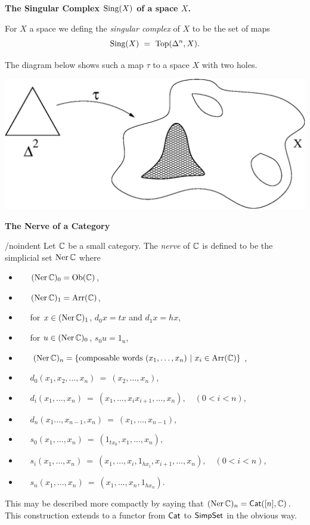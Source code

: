 \newpage\noindent
{\bf The Singular Complex $\mathrm{Sing}(X)$ of a space $X$.}

\medskip
For $X$ a space we defing the \emph{singular complex} of $X$ to be 
the set of maps 
$$
\mathrm{Sing}(X) ~=~ \mathrm{Top}(\Delta^n,X). 
$$

The diagram below shows such a map $\tau$ to a space $X$ with two holes.
\begin{center}
\includegraphics[scale = 0.7]{simp-gps/delta2X.eps}
\end{center}


\bigskip\noindent
{\bf The Nerve of a Category} 

\medskip/noindent
Let $\mathbb{C}$ be a small category. 
The \emph{nerve} of $\mathbb{C}$ is defined to be the simplicial set $\mathrm{Ner}\,\mathbb{C}$ 
where 
\begin{itemize}
\item~~
$(\mathrm{Ner}\,\mathbb{C})_0 = \mathrm{Ob}(\mathbb{C})$, 
\item~~
$(\mathrm{Ner}\,\mathbb{C})_1 = \mathrm{Arr}(\mathbb{C})$, 
\item~~
for $x \in (\mathrm{Ner}\,\mathbb{C})_1$, $d_0 x = tx$ and $d_1x = hx$, 
\item~~
for $u \in (\mathrm{Ner}\,\mathbb{C})_0$, $s_0u = 1_u$, 
\item~~
$(\mathrm{Ner}\,\mathbb{C})_n = \{ \text{composable words}~ (x_1,\ldots,x_n) ~|~  
                    x_i \in \mathrm{Arr}(\mathbb{C}) \}$, 
\item~~
$d_0(x_1,x_2,\ldots,x_n) ~=~ (x_2,\ldots,x_n)$, 
\item~~
$d_i(x_1,\ldots,x_n) ~=~ (x_1,\ldots,x_ix_{i+1},\ldots,x_n), \quad (0<i<n)$, 
\item~~
$d_n(x_1\ldots,x_{n-1},x_n) ~=~ (x_1,\ldots,x_{n-1})$, 
\item~~
$s_0(x_1,\ldots,x_n) ~=~ (1_{tx_0},x_1,\ldots,x_n)$, 
\item~~
$s_i(x_1,\ldots,x_n) ~=~ (x_1,\ldots,x_i,1_{hx_i},x_{i+1},\ldots,x_n), 
\quad (0<i<n)$, 
\item~~
$s_n(x_1,\ldots,x_n) ~=~ (x_1,\ldots,x_n,1_{hx_n})$. 
\end{itemize}

This may be described more compactly by saying that 
$(\mathrm{Ner}\,\mathbb{C})_n = {\sf Cat}([n],\mathbb{C})$. 
This construction extends to a functor from ${\sf Cat}$ to ${\sf SimpSet}$ 
in the obvious way. 

 


